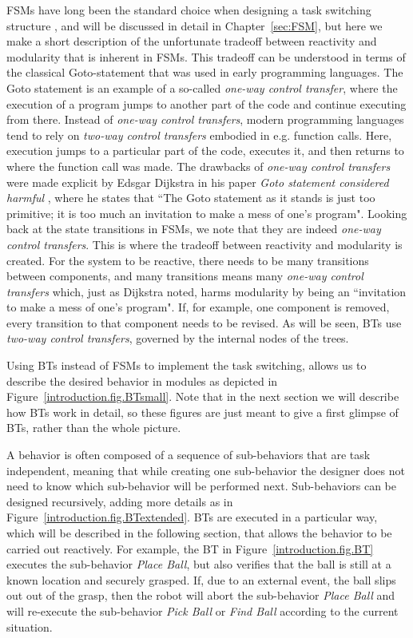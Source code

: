 FSMs have long been the standard choice when designing a task switching structure \cite{powers2012sting,montemerlo2008junior}, and
 will be discussed in detail in Chapter~\ref{sec:FSM}, but here we make a short description of the unfortunate tradeoff between reactivity and modularity that is inherent in FSMs.
This tradeoff can be understood in terms of the classical Goto-statement that was used in early programming languages.
The Goto statement is an example of a so-called
\emph{one-way control transfer}, where the execution of a program jumps to another part of the code and continue executing from there.
Instead of \emph{one-way control transfers}, modern programming languages tend to rely on 
\emph{two-way control transfers} embodied in e.g. function calls. Here, execution jumps to a particular part of the code, executes it, and then returns to where the function call was made. The drawbacks of \emph{one-way control transfers} were made explicit by 
 Edsgar Dijkstra in his paper \emph{Goto statement considered harmful} \cite{Dijkstra:1968:LEG:362929.362947}, where he states that
``The Goto statement as it stands is just too primitive; it is too much an invitation to make a mess of one's program".
Looking back at the state transitions in  FSMs, we note that they  are indeed \emph{one-way control transfers}. 
This is where the tradeoff between reactivity and modularity is created.
For the system to be reactive, there needs to be many transitions between components, and many transitions means many  \emph{one-way control transfers}
which, just as Dijkstra noted, harms modularity by being an ``invitation to make a mess of one's program". 
If, for example, one component is removed, every transition to that component needs to be revised.
As will be seen, BTs use \emph{two-way control transfers}, governed by the internal nodes of the trees.



 Using BTs instead of FSMs 
to implement the task switching, allows us to describe the desired behavior in modules as depicted in Figure~\ref{introduction.fig.BTsmall}. 
Note that in the next section we will describe how BTs work in detail, so these figures are just meant to give a first glimpse of BTs, rather than the whole picture.

 A behavior is often composed of a sequence of sub-behaviors that are task independent, meaning that while creating one sub-behavior the designer does not need to know which sub-behavior will be performed next. Sub-behaviors can be designed recursively, adding more details as in Figure~\ref{introduction.fig.BTextended}. BTs are executed in a particular way, which will be described in the following section, that allows the behavior to be carried out reactively. For example, the BT in Figure~\ref{introduction.fig.BT} executes the sub-behavior \emph{Place Ball}, but also verifies that the ball is still at a known location and securely grasped. If, due to an external event, the ball slips out out of the grasp, then the robot will abort the sub-behavior \emph{Place Ball} and will re-execute the sub-behavior \emph{Pick Ball} or \emph{Find Ball} according to the current situation. 


